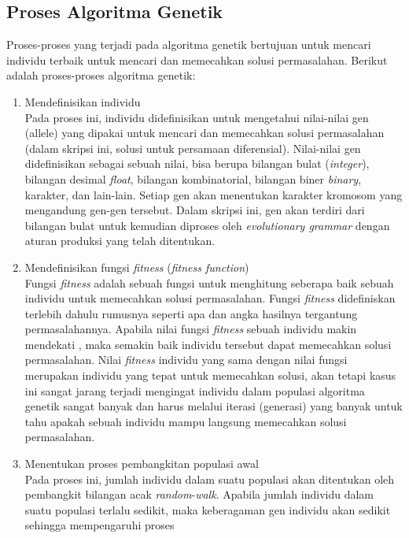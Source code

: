 \subsection{Proses Algoritma Genetik}
\label{sec:AGprocess}

Proses-proses yang terjadi pada algoritma genetik bertujuan untuk mencari individu terbaik untuk mencari dan memecahkan solusi permasalahan. Berikut adalah proses-proses algoritma genetik:

\begin{enumerate}[1.]

	\item Mendefinisikan individu
	\\
	Pada proses ini, individu didefinisikan untuk mengetahui nilai-nilai gen (allele) yang dipakai untuk mencari dan memecahkan solusi permasalahan (dalam skripsi ini, solusi untuk persamaan diferensial). Nilai-nilai gen didefinisikan sebagai sebuah nilai, bisa berupa bilangan bulat 		(\textit{integer}), bilangan desimal \textit{float}, bilangan kombinatorial, bilangan biner \textit{binary}, karakter, dan lain-lain. Setiap gen akan menentukan karakter kromosom yang mengandung gen-gen tersebut. Dalam skripsi ini, gen akan terdiri dari bilangan bulat
	 untuk kemudian diproses oleh \textit{evolutionary grammar} dengan aturan produksi yang telah ditentukan.
	\item Mendefinisikan fungsi \textit{fitness} (\textit{fitness function})
	\\
	Fungsi \textit{fitness} adalah sebuah fungsi untuk menghitung seberapa baik sebuah individu untuk memecahkan solusi permasalahan. Fungsi \textit{fitness} didefiniskan terlebih dahulu rumusnya seperti apa dan angka hasilnya tergantung permasalahannya. Apabila nilai 		fungsi \textit{fitness} sebuah individu makin mendekati , maka semakin baik individu tersebut dapat memecahkan solusi permasalahan. Nilai \textit{fitness} individu yang sama dengan nilai fungsi merupakan individu yang tepat untuk memecahkan solusi, akan tetapi
	kasus ini sangat jarang terjadi mengingat individu dalam populasi algoritma genetik sangat banyak dan harus melalui iterasi (generasi) yang banyak untuk tahu apakah sebuah individu mampu langsung memecahkan solusi permasalahan. 
	\\
	\item Menentukan proses pembangkitan populasi awal
	\\
	Pada proses ini, jumlah individu dalam suatu populasi akan ditentukan oleh pembangkit bilangan acak \textit{random}-\textit{walk}. Apabila jumlah individu dalam suatu populasi terlalu sedikit, maka keberagaman gen individu akan sedikit sehingga mempengaruhi proses

\end{enumerate}
